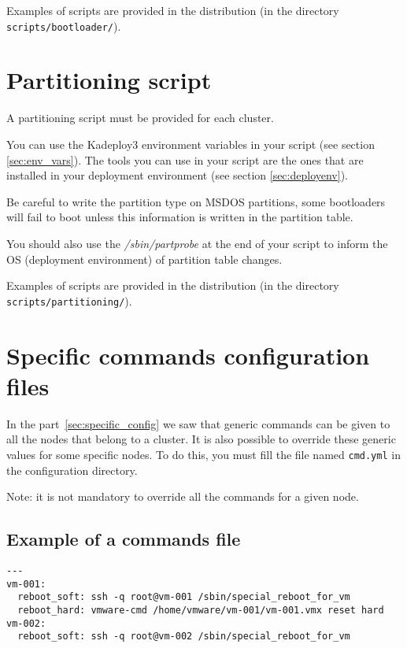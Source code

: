 \documentclass[a4wide,10pt,oneside]{book}
\begin{document}
Examples of scripts are provided in the distribution (in the directory \texttt{scripts/bootloader/}).

\section{Partitioning script}\label{sec:partscript}
A partitioning script must be provided for each cluster.

You can use the Kadeploy3 environment variables in your script (see section \ref{sec:env_vars}). The tools you can use in your script are the ones that are installed in your deployment environment (see section \ref{sec:deployenv}).

Be careful to write the partition type on MSDOS partitions, some bootloaders will fail to boot unless this information is written in the partition table.

You should also use the \emph{/sbin/partprobe} at the end of your script to inform the OS (deployment environment) of partition table changes.

Examples of scripts are provided in the distribution (in the directory \texttt{scripts/partitioning/}).

\section{Specific commands configuration files}
In the part~\ref{sec:specific_config} we saw that generic commands can be given to all the nodes that belong to a cluster. It is also possible to override these generic values for some specific nodes. To do this, you must fill the file named \texttt{cmd.yml} in the configuration directory.

Note: it is not mandatory to override all the commands for a given node.

\subsection{Example of a commands file\\}
\begin{small}
\begin{verbatim}
---
vm-001:
  reboot_soft: ssh -q root@vm-001 /sbin/special_reboot_for_vm
  reboot_hard: vmware-cmd /home/vmware/vm-001/vm-001.vmx reset hard
vm-002:
  reboot_soft: ssh -q root@vm-002 /sbin/special_reboot_for_vm
\end{verbatim}
\end{small}
\end{document}
